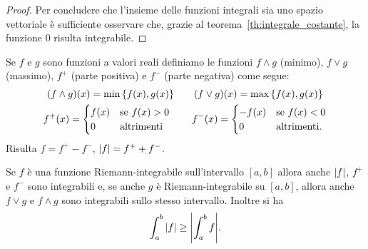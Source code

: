 \begin{proof}
Per concludere che l'insieme delle funzioni integrali sia uno spazio vettoriale
è sufficiente osservare che, grazie al teorema~\ref{th:integrale_costante},
la funzione $0$ risulta integrabile.
\end{proof}

\begin{theorem}
\label{th:reticolo}%
Se $f$ e $g$ sono funzioni a valori reali definiamo le
funzioni $f\wedge g$ (minimo), $f \vee g$ (massimo),
$f^+$ (parte positiva) e $f^-$ (parte negativa) come segue:
\begin{gather*}
  (f \wedge g)(x) = \min{\left\{ f(x), g(x) \right\}}  \qquad
  (f \vee g)(x) = \max{\left\{ f(x), g(x) \right\}} \\
  f^+ (x) =
      \begin{cases}
      f(x) & \text{se $f(x)> 0$}\\
      0 & \text{altrimenti}
      \end{cases} \qquad
  f^- (x) =
      \begin{cases}
      -f(x) & \text{se $f(x)< 0$}\\
      0 & \text{altrimenti.}
      \end{cases}
\end{gather*}
Risulta $f= f^+ - f^-$, ${\left|f\right|}=f^+ + f^-$.

Se $f$ è una funzione Riemann-integrabile sull'intervallo $[a,b]$ allora
anche ${\left|f\right|}$, $f^+$ e $f^-$ sono integrabili e, se
anche $g$ è Riemann-integrabile su $[a,b]$, allora anche $f\vee g$ e $f\wedge g$
sono integrabili sullo stesso intervallo.
Inoltre si ha 
\begin{equation}\label{eq:489732}
  \int_a^b {\left|f\right|} \ge {\left|\int_a^b f\right|}.  
\end{equation}
\end{theorem}
%
